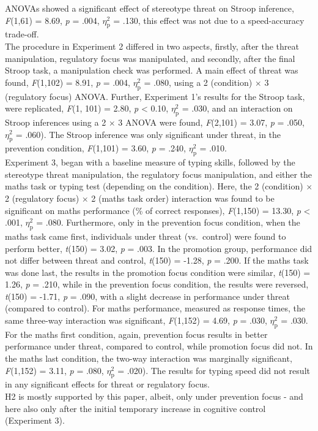\documentclass[
  stu,floatsintext]{apa7}
\begin{document}
ANOVAs showed a significant effect of stereotype threat on Stroop inference, \emph{F}(1,61) = 8.69, \emph{p} = .004, \(\eta^{2}_{\text{p}}\) = .130, this effect was not due to a speed-accuracy trade-off.\\
The procedure in Experiment 2 differed in two aspects, firstly, after the threat manipulation, regulatory focus was manipulated, and secondly, after the final Stroop task, a manipulation check was performed.
A main effect of threat was found, \emph{F}(1,102) = 8.91, \emph{p} = .004, \(\eta^{2}_{\text{p}}\) = .080, using a 2 (condition) \(\times\) 3 (regulatory focus) ANOVA.
Further, Experiment 1's results for the Stroop task, were replicated, \emph{F}(1, 101) = 2.80, \emph{p} \textless{} 0.10, \(\eta^{2}_{\text{p}}\) = .030, and an interaction on Stroop inferences using a 2 \(\times\) 3 ANOVA were found, \emph{F}(2,101) = 3.07, \emph{p} = .050, \(\eta^{2}_{\text{p}}\) = .060).
The Stroop inference was only significant under threat, in the prevention condition, \emph{F}(1,101) = 3.60, \emph{p} = .240, \(\eta^{2}_{\text{p}}\) = .010.\\
Experiment 3, began with a baseline measure of typing skills, followed by the stereotype threat manipulation, the regulatory focus manipulation, and either the maths task or typing test (depending on the condition).
Here, the 2 (condition) \(\times\) 2 (regulatory focus) \(\times\) 2 (maths task order) interaction was found to be significant on maths performance (\% of correct responses), \emph{F}(1,150) = 13.30, \emph{p} \textless{} .001, \(\eta^{2}_{\text{p}}\) = .080.
Furthermore, only in the prevention focus condition, when the maths task came first, individuals under threat (vs.~control) were found to perform better, \emph{t}(150) = 3.02, \emph{p} = .003.
In the promotion group, performance did not differ between threat and control, \emph{t}(150) = -1.28, \emph{p} = .200.
If the maths task was done last, the results in the promotion focus condition were similar, \emph{t}(150) = 1.26, \emph{p} = .210, while in the prevention focus condition, the results were reversed, \emph{t}(150) = -1.71, \emph{p} = .090, with a slight decrease in performance under threat (compared to control).
For maths performance, measured as response times, the same three-way interaction was significant, \emph{F}(1,152) = 4.69, \emph{p} = .030, \(\eta^{2}_{\text{p}}\) = .030.
For the maths first condition, again, prevention focus results in better performance under threat, compared to control, while promotion focus did not.
In the maths last condition, the two-way interaction was marginally significant, \emph{F}(1,152) = 3.11, \emph{p} = .080, \(\eta^{2}_{\text{p}}\) = .020).
The results for typing speed did not result in any significant effects for threat or regulatory focus.\\
H2 is mostly supported by this paper, albeit, only under prevention focus - and here also only after the initial temporary increase in cognitive control (Experiment 3).
\end{document}
